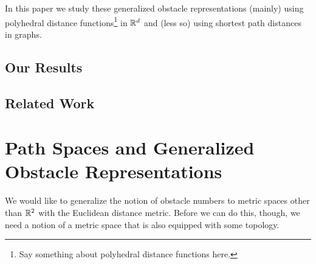 \documentclass{patmorin}
\begin{document}
In this paper we study these generalized obstacle representations
(mainly) using polyhedral distance functions\footnote{Say something
about polyhedral distance functions here.} in $\mathbb{R}^d$ and (less so)
using shortest path distances in graphs.  

\subsection{Our Results}
%
%
%
%
%
%
%

\subsection{Related Work}


\section{Path Spaces and Generalized Obstacle Representations}

We would like to generalize the notion of obstacle numbers to metric
spaces other than $\mathbb{R}^2$ with the Euclidean distance metric.  Before we
can do this, though, we need a notion of a metric space that is also
equipped with some topology.
\end{document}
